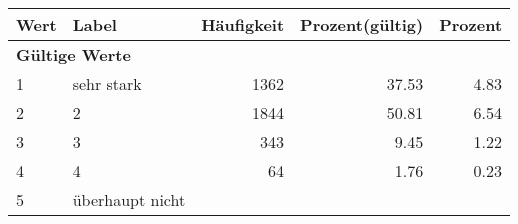      \begin{longtable}{lXrrr}
     \toprule
     \textbf{Wert} & \textbf{Label} & \textbf{Häufigkeit} & \textbf{Prozent(gültig)} & \textbf{Prozent} \\
     \endhead
     \midrule
     \multicolumn{5}{l}{\textbf{Gültige Werte}}\\

     1 &
     \multicolumn{1}{X}{ sehr stark   } &


       \num{1362} &
       \num[round-mode=places,round-precision=2]{37.53} &
         \num[round-mode=places,round-precision=2]{4.83} \\

     2 &
     \multicolumn{1}{X}{ 2   } &


       \num{1844} &
       \num[round-mode=places,round-precision=2]{50.81} &
         \num[round-mode=places,round-precision=2]{6.54} \\

     3 &
     \multicolumn{1}{X}{ 3   } &


       \num{343} &
       \num[round-mode=places,round-precision=2]{9.45} &
         \num[round-mode=places,round-precision=2]{1.22} \\

     4 &
     \multicolumn{1}{X}{ 4   } &


       \num{64} &
       \num[round-mode=places,round-precision=2]{1.76} &
         \num[round-mode=places,round-precision=2]{0.23} \\

     5 &
     \multicolumn{1}{X}{ überhaupt nicht   } &



\end{longtable}

